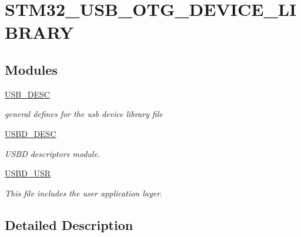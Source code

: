 \hypertarget{group__STM32__USB__OTG__DEVICE__LIBRARY}{\section{S\-T\-M32\-\_\-\-U\-S\-B\-\_\-\-O\-T\-G\-\_\-\-D\-E\-V\-I\-C\-E\-\_\-\-L\-I\-B\-R\-A\-R\-Y}
\label{group__STM32__USB__OTG__DEVICE__LIBRARY}
}
\subsection*{Modules}
\begin{DoxyCompactItemize}
\item 
\hyperlink{group__USB__DESC}{U\-S\-B\-\_\-\-D\-E\-S\-C}
\begin{DoxyCompactList}\small\item\em general defines for the usb device library file \end{DoxyCompactList}\item 
\hyperlink{group__USBD__DESC}{U\-S\-B\-D\-\_\-\-D\-E\-S\-C}
\begin{DoxyCompactList}\small\item\em U\-S\-B\-D descriptors module. \end{DoxyCompactList}\item 
\hyperlink{group__USBD__USR}{U\-S\-B\-D\-\_\-\-U\-S\-R}
\begin{DoxyCompactList}\small\item\em This file includes the user application layer. \end{DoxyCompactList}\end{DoxyCompactItemize}


\subsection{Detailed Description}
